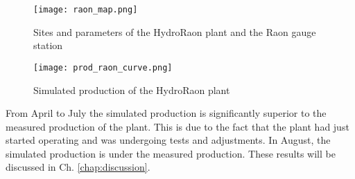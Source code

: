 \begin{figure}[H]
\centering
\texttt{[image: raon\_map.png]}
\caption{Sites and parameters of the HydroRaon plant and the Raon gauge station}
\label{raon_map}
\end{figure}

\begin{figure}[H]
\centering
\texttt{[image: prod\_raon\_curve.png]}
\caption{Simulated production of the HydroRaon plant}
\label{prod_raon_curve}
\end{figure}

From April to July the simulated production is significantly superior to the measured production of the plant. This is due to the fact that the plant had just started operating and was undergoing tests and adjustments. In August, the simulated production is under the measured production. These results will be discussed in Ch. \ref{chap:discussion}.

